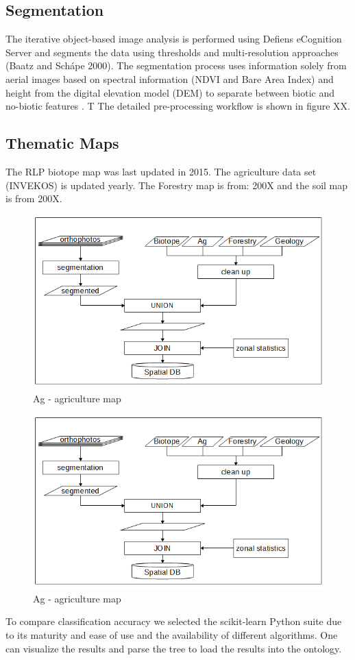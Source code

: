\documentclass[authoryear, review,12pt,number]{elsarticle}
\begin{document}
\subsection{Segmentation} The iterative object-based image analysis is
performed using Defiens eCognition Server and segments the data using
thresholds and multi-resolution approaches (Baatz and Sch\'ape 2000). The
segmentation process uses information solely from aerial images based on
spectral information (NDVI and Bare Area Index) and height from the digital
elevation model (DEM) to separate between biotic and no-biotic features
\citep{Tintrup2015}. T The detailed pre-processing workflow is shown in figure
XX.
\subsection{Thematic Maps} The RLP biotope map was last updated in 2015. The
agriculture data set (INVEKOS) is updated yearly. The Forestry map is from:
200X and the soil map is from 200X.

\begin{figure} \includegraphics[width=1\textwidth]{diagrams/pre_processing.png}
    \caption{Ag - agriculture map} \end{figure}

\begin{figure} \includegraphics[width=1\textwidth]{diagrams/pre_processing.png}
    \caption{Ag - agriculture map} \end{figure}
To compare classification accuracy we selected the scikit-learn Python suite
\citep{scikit-learn} due to its maturity and ease of use and the availability of
different algorithms. One can visualize the results and parse the tree to load
the results into the ontology.
\end{document}
